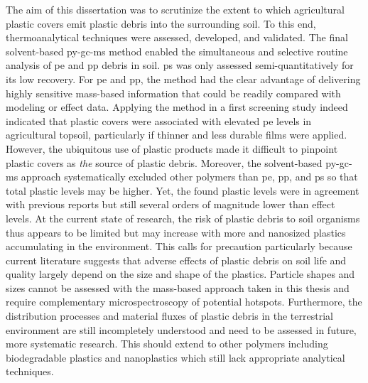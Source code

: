The aim of this dissertation was to scrutinize the extent to which agricultural plastic covers emit plastic debris into the surrounding soil. To this end, thermoanalytical techniques were assessed, developed, and validated. The final solvent-based \ac{py-gc-ms} method enabled the simultaneous and selective routine analysis of \ac{pe} and \ac{pp} debris in soil. \Ac{ps} was only assessed semi-quantitatively for its low recovery. For \ac{pe} and \ac{pp}, the method had the clear advantage of delivering highly sensitive mass-based information that could be readily compared with modeling or effect data. Applying the method in a first screening study indeed indicated that plastic covers were associated with elevated \ac{pe} levels in agricultural topsoil, particularly if thinner and less durable films were applied. However, the ubiquitous use of plastic products made it difficult to pinpoint plastic covers as \emph{the} source of plastic debris. Moreover, the solvent-based \ac{py-gc-ms} approach systematically excluded other polymers than \ac{pe}, \ac{pp}, and \ac{ps} so that total plastic levels may be higher. Yet, the found plastic levels were in agreement with previous reports but still several orders of magnitude lower than effect levels.
At the current state of research, the risk of plastic debris to soil organisms thus appears to be limited but may increase with more and nanosized plastics accumulating in the environment. This calls for precaution particularly because current literature suggests that adverse effects of plastic debris on soil life and quality largely depend on the size and shape of the plastics. Particle shapes and sizes cannot be assessed with the mass-based approach taken in this thesis and require complementary microspectroscopy of potential hotspots. 
Furthermore, the distribution processes and material fluxes of plastic debris in the terrestrial environment are still incompletely understood and need to be assessed in future, more systematic research. This should extend to other polymers including biodegradable plastics and nanoplastics which still lack appropriate analytical techniques.
